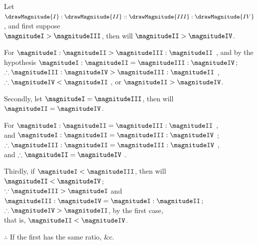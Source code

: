 \documentclass[booklanguage=english]{byrnebook}
\begin{document}
\begin{center}
Let $\drawMagnitude{I} : \drawMagnitude{II} :: \drawMagnitude{III} : \drawMagnitude{IV}$, and first suppose\\
$\magnitudeI > \magnitudeIII$, then will $\magnitudeII > \magnitudeIV$.

For $\magnitudeI : \magnitudeII > \magnitudeIII : \magnitudeII$ , and by the hypothesis $\magnitudeI : \magnitudeII = \magnitudeIII : \magnitudeIV$;\\
$\therefore \magnitudeIII : \magnitudeIV > \magnitudeIII : \magnitudeII$ ,\\
$\therefore \magnitudeIV < \magnitudeII$ , or $\magnitudeII > \magnitudeIV$.

Secondly, let $\magnitudeI = \magnitudeIII$, then will $\magnitudeII = \magnitudeIV$.

For $\magnitudeI : \magnitudeII = \magnitudeIII : \magnitudeII$ ,\\
and $\magnitudeI : \magnitudeII = \magnitudeIII : \magnitudeIV$ \byref{\hypref};\\
$\therefore \magnitudeIII : \magnitudeII = \magnitudeIII : \magnitudeIV$ ,\\
and $\therefore \magnitudeII = \magnitudeIV$ .

Thirdly, if $\magnitudeI < \magnitudeIII$, then will $\magnitudeII < \magnitudeIV$;\\
$\because \magnitudeIII > \magnitudeI$ and $\magnitudeIII : \magnitudeIV = \magnitudeI : \magnitudeII$;\\ %
$\therefore \magnitudeIV > \magnitudeII$, by the first case,\\
that is, $\magnitudeII < \magnitudeIV$.

$\therefore$ If the first has the same ratio, \&c.
\end{center}

\vfill\pagebreak

\label{prop:V.XV}
\end{document}
